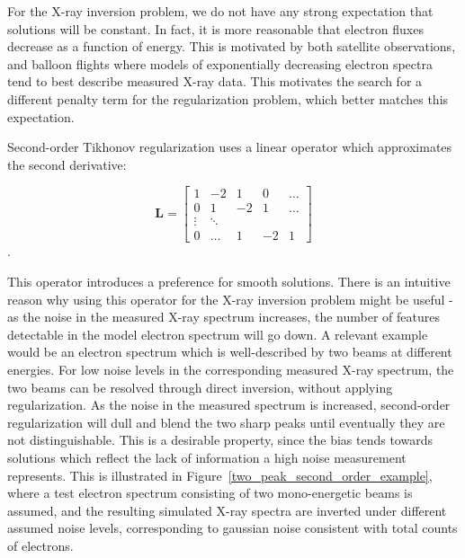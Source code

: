 For the X-ray inversion problem, we do not have any strong expectation that solutions will be constant. In fact, it is more reasonable that electron fluxes decrease as a function of energy. This is motivated by both satellite observations, and balloon flights where models of exponentially decreasing electron spectra tend to best describe measured X-ray data. This motivates the search for a different penalty term for the regularization problem, which better matches this expectation. 

Second-order Tikhonov regularization uses a linear operator which approximates the second derivative:

\[
\mathbf{L} = \begin{bmatrix} 
    1 & -2 & 1 & 0 & \dots \\
    0 & 1 & -2 & 1 & \dots \\
    \vdots & \ddots & \\
    0 & \dots & 1 & -2 & 1 
    \end{bmatrix}
\].

This operator introduces a preference for smooth solutions. There is an intuitive reason why using this operator for the X-ray inversion problem might be useful - as the noise in the measured X-ray spectrum increases, the number of features detectable in the model electron spectrum will go down. A relevant example would be an electron spectrum which is well-described by two beams at different energies. For low noise levels in the corresponding measured X-ray spectrum, the two beams can be resolved through direct inversion, without applying regularization. As the noise in the measured spectrum is increased, second-order regularization will dull and blend the two sharp peaks until eventually they are not distinguishable.  This is a desirable property, since the bias tends towards solutions which reflect the lack of information a high noise measurement represents. This is illustrated in Figure~\ref{two_peak_second_order_example}, where a test electron spectrum consisting of two mono-energetic beams is assumed, and the resulting simulated X-ray spectra are inverted under different assumed noise levels, corresponding to gaussian noise consistent with total counts of electrons. 

